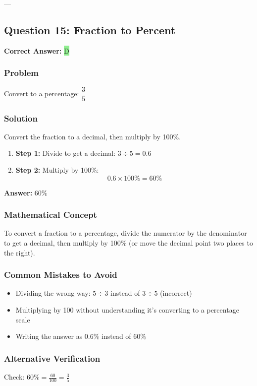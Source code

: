 \documentclass[12pt]{article}
\begin{document}
---

\subsection{Question 15: Fraction to Percent}

\textbf{Correct Answer: } \colorbox{lightgreen}{D}

\subsubsection*{Problem}
Convert to a percentage: $\dfrac{3}{5}$

\subsubsection*{Solution}

Convert the fraction to a decimal, then multiply by 100\%.

\begin{enumerate}
\item \textbf{Step 1:} Divide to get a decimal: $3 \div 5 = 0.6$
\item \textbf{Step 2:} Multiply by 100\%:
  \[
  0.6 \times 100\% = 60\%
  \]
\end{enumerate}

\textbf{Answer: } $60\%$

\subsubsection*{Mathematical Concept}
To convert a fraction to a percentage, divide the numerator by the denominator to get a decimal, then multiply by 100\% (or move the decimal point two places to the right).

\subsubsection*{Common Mistakes to Avoid}
\begin{itemize}
\item Dividing the wrong way: $5 \div 3$ instead of $3 \div 5$ (incorrect)
\item Multiplying by 100 without understanding it's converting to a percentage scale
\item Writing the answer as 0.6\% instead of 60\%
\end{itemize}

\subsubsection*{Alternative Verification}
Check: $60\% = \frac{60}{100} = \frac{3}{5}$ 
\end{document}

